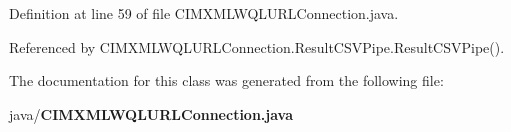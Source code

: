 Definition at line 59 of file C\+I\+M\+X\+M\+L\+W\+Q\+L\+U\+R\+L\+Connection.\+java.



Referenced by C\+I\+M\+X\+M\+L\+W\+Q\+L\+U\+R\+L\+Connection.\+Result\+C\+S\+V\+Pipe.\+Result\+C\+S\+V\+Pipe().



The documentation for this class was generated from the following file\+:\begin{DoxyCompactItemize}
\item 
java/{\bf C\+I\+M\+X\+M\+L\+W\+Q\+L\+U\+R\+L\+Connection.\+java}\end{DoxyCompactItemize}
